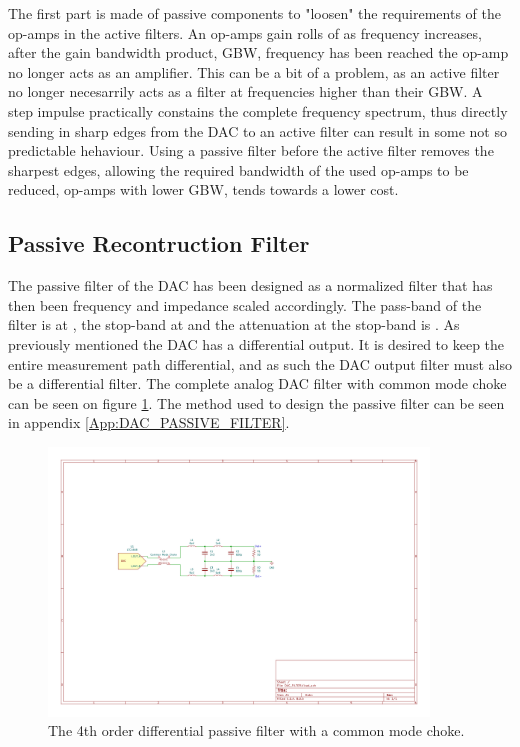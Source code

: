 The first part is made of passive components to "loosen" the requirements of the op-amps in the active filters. An op-amps gain rolls of as frequency increases, after the gain bandwidth product, GBW, frequency has been reached the op-amp no longer acts as an amplifier. This can be a bit of a problem, as an active filter no longer necesarrily acts as a filter at frequencies higher than their GBW. A step impulse practically constains the complete frequency spectrum, thus directly sending in sharp edges from the DAC to an active filter can result in some not so predictable hehaviour. Using a passive filter before the active filter removes the sharpest edges, allowing the required bandwidth of the used op-amps to be reduced, op-amps with lower GBW, tends towards a lower cost.

\subsection*{Passive Recontruction Filter}
The passive filter of the DAC has been designed as a normalized filter that has then been frequency and impedance scaled accordingly. The pass-band of the filter is at , the stop-band at  and the attenuation at the stop-band is . As previously mentioned the DAC has a differential output. It is desired to keep the entire measurement path differential, and as such the DAC output filter must also be a differential filter. The complete analog DAC filter with common mode choke can be seen on figure \ref{fig_7_1_1_DAC_PASSIVE}. The method used to design the passive filter can be seen in appendix \ref{App:DAC_PASSIVE_FILTER}.

\begin{figure}[H]
    \centering
    \includegraphics[clip, trim=150 300 250 200, width=0.9\textwidth]{Sections/7_SystemDesign/Figures/7_1_1_DAC_PASSIVE_FILTER.pdf}
    \caption{The 4th order differential passive filter with a common mode choke.}
    \label{fig_7_1_1_DAC_PASSIVE}
\end{figure}

